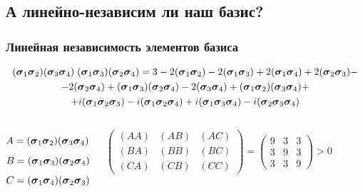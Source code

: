 \documentclass{beamer}
\begin{document}
\subsection{А линейно-независим ли наш базис?}
\begin{frame}
\frametitle{Линейная независимость элементов базиса}
\small
$$\begin{gathered}(\cc_1\cc_2)(\cc_3\cc_4)\;(\cc_1\cc_3)(\cc_2\cc_4) = 
3-2 (\cc_1\cc_2)-2 (\cc_1\cc_3)+2 (\cc_1\cc_4)+2 (\cc_2\cc_3)-\\
-2 (\cc_2\cc_4)+(\cc_1\cc_3) (\cc_2\cc_4)-2 (\cc_3\cc_4)+(\cc_1\cc_2) (\cc_3\cc_4)+\\+i (\cc_1\cc_2\cc_3)-i (\cc_1\cc_2\cc_4)+i (\cc_1\cc_3\cc_4)-i (\cc_2\cc_3\cc_4)\end{gathered}$$

\begin{columns}[c] %
$$A=(\cc_1\cc_2)(\cc_3\cc_4)$$
$$B=(\cc_1\cc_3)(\cc_2\cc_4)$$
$$C=(\cc_1\cc_4)(\cc_2\cc_3)$$

$$
\begin{pmatrix}
(AA)&(AB)&(AC)\\
(BA)&(BB)&(BC)\\
(CA)&(CB)&(CC)
\end{pmatrix}
=
\begin{pmatrix}
9&3&3\\
3&9&3\\
3&3&9
\end{pmatrix}
> 0
$$
\end{columns}
\normalsize
\end{frame}
\end{document}
